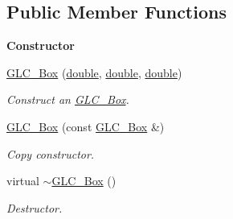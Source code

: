 \subsection*{Public Member Functions}
\begin{Indent}{\bf Constructor}\par
\begin{DoxyCompactItemize}
\item 
\hyperlink{class_g_l_c___box_af0351a3c5ac936392dcbc90744e3ff68}{G\-L\-C\-\_\-\-Box} (\hyperlink{_super_l_u_support_8h_a8956b2b9f49bf918deed98379d159ca7}{double}, \hyperlink{_super_l_u_support_8h_a8956b2b9f49bf918deed98379d159ca7}{double}, \hyperlink{_super_l_u_support_8h_a8956b2b9f49bf918deed98379d159ca7}{double})
\begin{DoxyCompactList}\small\item\em Construct an \hyperlink{class_g_l_c___box}{G\-L\-C\-\_\-\-Box}. \end{DoxyCompactList}\item 
\hyperlink{class_g_l_c___box_a6a84879ad50528bb3b9b3651ce10a8d5}{G\-L\-C\-\_\-\-Box} (const \hyperlink{class_g_l_c___box}{G\-L\-C\-\_\-\-Box} \&)
\begin{DoxyCompactList}\small\item\em Copy constructor. \end{DoxyCompactList}\item 
virtual \hyperlink{class_g_l_c___box_afdd986837650c1b73dae1e5a11965c42}{$\sim$\-G\-L\-C\-\_\-\-Box} ()
\begin{DoxyCompactList}\small\item\em Destructor. \end{DoxyCompactList}\end{DoxyCompactItemize}
\end{Indent}
